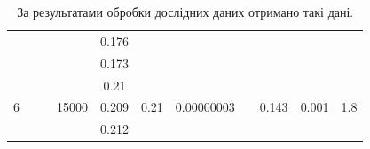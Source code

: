\documentclass[a4paper,12pt]{article}
\begin{document}
\begin{table}[h!]
\begin{tabular}{|c|c|c|c|c|c|c|c|c|c|c|}
			&                        &                                                          &                        & 0.176  &                        &                             &                                 &                        &                        &                        \\ \cline{5-5}
			&                        &                                                          &                        & 0.173  &                        &                             &                                 &                        &                        &                        \\ \cline{1-1} \cline{4-7} \cline{9-11} 
			\multirow{3}{*}{6} &                        &                                                          & \multirow{3}{*}{15000} & 0.21   & \multirow{3}{*}{0.21}  & \multirow{3}{*}{0.00000003} &                                 & \multirow{3}{*}{0.143} & \multirow{3}{*}{0.001} & \multirow{3}{*}{1.8}   \\ \cline{5-5}
			&                        &                                                          &                        & 0.209  &                        &                             &                                 &                        &                        &                        \\ \cline{5-5}
			&                        &                                                          &                        & 0.212  &                        &                             &                                 &                        &                        &                        \\ \hline
		\end{tabular}
	\caption{За результатами обробки дослідних даних отримано такі дані.}
	\label{tabular:1}
	\end{table}
	
	
	
	
	
\end{document}
